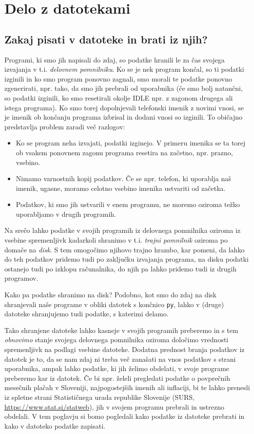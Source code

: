 \chapter{Delo z datotekami}

\section{Zakaj pisati v datoteke in brati iz njih?}

Programi, ki smo jih napisali do zdaj, so podatke hranili le za čas svojega izvajanja v t.i. \emph{delovnem pomnilniku}. Ko se je nek program končal, so ti podatki izginili in ko smo program ponovno zagnali, smo morali te podatke ponovno zgenerirati, npr. tako, da smo jih prebrali od uporabnika (če smo bolj natančni, so podatki izginili, ko smo resetirali okolje IDLE npr. z zagonom drugega ali istega programa). Ko smo torej dopolnjevali telefonski imenik z novimi vnosi, se je imenik ob končanju programa izbrisal in dodani vnosi so izginili. To običajno predstavlja problem zaradi več razlogov:
\begin{itemize}
    \item Ko se program neha izvajati, podatki izginejo. V primeru imenika se ta torej ob vsakem ponovnem zagonu programa resetira na začetno, npr. prazno, vsebino.
    \item Nimamo varnostnih kopij podatkov. Če se npr. telefon, ki uporablja naš imenik, ugasne, moramo celotno vsebino imenika ustvariti od začetka.
    \item Podatkov, ki smo jih ustvarili v enem programu, ne moremo oziroma težko uporabljamo v drugih programih. 
\end{itemize}
Na srečo lahko podatke v svojih programih iz delovnega pomnilnika oziroma iz vsebine spremenljivk kadarkoli shranimo v t.i. \emph{trajni pomnilnik} oziroma po domače na \emph{disk}. S tem omogočimo njihovo trajno hrambo, kar pomeni, da lahko do teh podatkov pridemo tudi po zaključku izvajanja programa, na disku podatki ostanejo tudi po izklopu računalnika, do njih pa lahko pridemo tudi iz drugih programov. 

Kako pa podatke shranimo na disk? Podobno, kot smo do zdaj na disk shranjevali naše programe v obliki datotek s končnico \texttt{py}, lahko v (druge) datoteke shranjujemo tudi podatke, s katerimi delamo. 

Tako shranjene datoteke lahko kasneje v svojih programih preberemo in s tem \emph{obnovimo} stanje svojega delovnega pomnilnika oziroma določimo vrednosti spremenljivk na podlagi vsebine datoteke. Dodatna prednost branja podatkov iz datotek je to, da se nam zdaj ni treba več zanašati na vnos podatkov s strani uporabnika, ampak lahko podatke, ki jih želimo obdelati, v svoje programe preberemo kar iz datotek. Če bi npr. želeli pregledati podatke o povprečnih mesečnih plačah v Sloveniji, najpogostejših imenih ali inflaciji, bi te lahko prenesli iz spletne strani Statističnega urada republike Slovenije (SURS, \url{https://www.stat.si/statweb}), jih v svojem programu prebrali in ustrezno obdelali. V tem poglavju si bomo pogledali kako podatke iz datoteke prebrati in kako v datoteko podatke zapisati.

